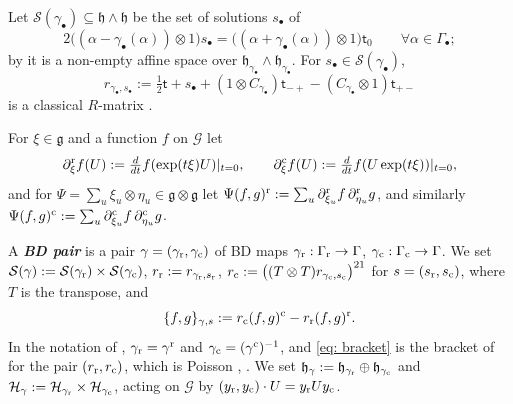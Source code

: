 \documentclass[a4paper]{amsart}
\numberwithin{equation}{section}
\theoremstyle{definition}
\theoremstyle{remark}
\newcommand{\mfh}{\mathfrak{h}}
\newcommand{\mfg}{\mathfrak{g}}
\newcommand{\mcG}{\mathcal{G}}
\newcommand{\mcH}{\mathcal{H}}
\newcommand{\mcS}{\mathcal{S}}
\newcommand{\rr}{{\rm r}}
\newcommand{\cc}{{\rm c}}
\newcommand{\Cas}{\mathsf t}
\newcommand{\newword}[1]{\textbf{\emph{#1}}}
\begin{document}
  Let $\mcS(\gamma_\bullet)\subseteq\mfh\wedge\mfh$ be the set of solutions $s_\bullet$ of
\begin{equation}
  \label{eq: system s}
  2\big((\alpha-\gamma_\bullet(\alpha))\otimes1\big)s_\bullet=\big((\alpha+\gamma_\bullet(\alpha))\otimes1\big)\Cas_0
  \qquad\forall\alpha\in\Gamma_\bullet;
\end{equation}
by \cite{BD82} it is a non-empty affine space over $\mfh_{\gamma_\bullet}\wedge\mfh_{\gamma_\bullet}$.
For $s_\bullet\in\mcS(\gamma_\bullet)$,
\[
  r_{\gamma_\bullet,s_\bullet}:=\tfrac12\Cas+s_\bullet+(1\otimes C_{\gamma_\bullet})\Cas_{-+}-(C_{\gamma_\bullet}\otimes1)\Cas_{+-}
\]
is a classical $R$-matrix \cite{BD82}.

For $\xi\in\mfg$ and a function $f$ on $\mcG$ let
\[
  \partial^\rr_\xi f(U):=\tfrac{d}{dt}f(\exp(t\xi)U)|_{t=0},
  \qquad
  \partial^\cc_\xi f(U):=\tfrac{d}{dt}f(U\exp(t\xi))|_{t=0},
\]
and for $\Psi=\sum_u\xi_u\otimes\eta_u\in\mfg\otimes\mfg$ let $\Psi(f,g)^\rr:=\sum_u\partial^\rr_{\xi_u}f\,\partial^\rr_{\eta_u}g$, and similarly $\Psi(f,g)^\cc:=\sum_u\partial^\cc_{\xi_u}f\,\partial^\cc_{\eta_u}g$.

A \newword{BD pair} is a pair $\gamma=(\gamma_{\rr},\gamma_{\cc})$ of BD maps $\gamma_{\rr}:\Gamma_{\rr}\to\Gamma$, $\gamma_{\cc}:\Gamma_{\cc}\to\Gamma$.
We set $\mcS(\gamma):=\mcS(\gamma_{\rr})\times\mcS(\gamma_{\cc})$, $r_\rr:=r_{\gamma_{\rr},s_{\rr}}$, $r_\cc:=\big((T\otimes T)r_{\gamma_{\cc},s_{\cc}}\big)^{21}$ for $s=(s_{\rr},s_{\cc})$, where $T$ is the transpose, and
\begin{equation}
  \label{eq: bracket}
  \{f,g\}_{\gamma,s}:=r_\cc(f,g)^\cc-r_\rr(f,g)^\rr.
\end{equation}
In the notation of \cite{GSV19,GSV23}, $\gamma_{\rr}=\gamma^\rr$ and $\gamma_{\cc}=(\gamma^\cc)^{-1}$, and \eqref{eq: bracket} is the bracket of \cite[Section~2.2]{GSV23} for the pair $(r_\rr,r_\cc)$, which is Poisson \cite[Section~2.2]{GSV23}, \cite[Section~2.2]{GSV19}.
We set $\mfh_\gamma:=\mfh_{\gamma_{\rr}}\oplus\mfh_{\gamma_{\cc}}$ and $\mcH_\gamma:=\mcH_{\gamma_{\rr}}\times\mcH_{\gamma_{\cc}}$, acting on $\mcG$ by $(y_{\rr},y_{\cc})\cdot U=y_{\rr}Uy_{\cc}$.
\end{document}
